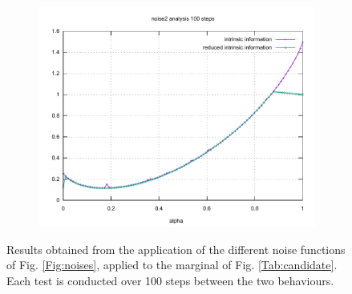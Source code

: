 \begin{figure}[h!]
\begin{subfigure}{\linewidth}
			\centering
			\includegraphics[scale=0.3]{images/graphs/noise2_FourPDstr_100.pdf}
		\end{subfigure}
		\caption{Results obtained from the application of the different noise functions of Fig. \ref{Fig:noises}, applied to the marginal of Fig. \ref{Tab:candidate}. Each test is conducted over 100 steps between the two behaviours.}
\end{figure}



    
    